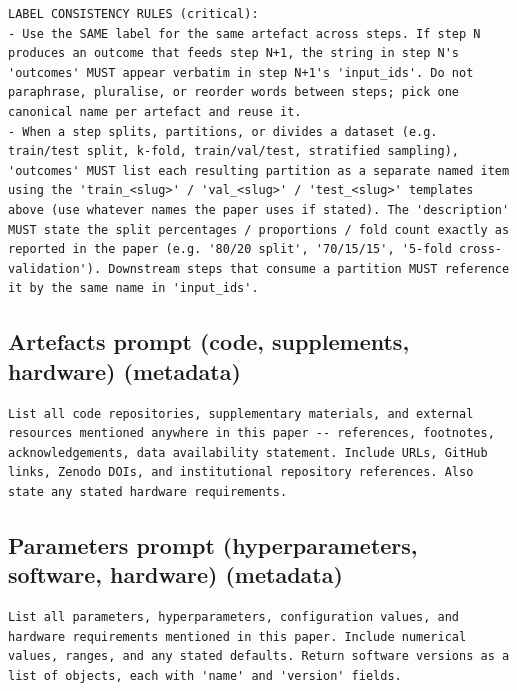 \documentclass{article}
\begin{document}
\begin{lstlisting}
LABEL CONSISTENCY RULES (critical):
- Use the SAME label for the same artefact across steps. If step N produces an outcome that feeds step N+1, the string in step N's 'outcomes' MUST appear verbatim in step N+1's 'input_ids'. Do not paraphrase, pluralise, or reorder words between steps; pick one canonical name per artefact and reuse it.
- When a step splits, partitions, or divides a dataset (e.g. train/test split, k-fold, train/val/test, stratified sampling), 'outcomes' MUST list each resulting partition as a separate named item using the 'train_<slug>' / 'val_<slug>' / 'test_<slug>' templates above (use whatever names the paper uses if stated). The 'description' MUST state the split percentages / proportions / fold count exactly as reported in the paper (e.g. '80/20 split', '70/15/15', '5-fold cross-validation'). Downstream steps that consume a partition MUST reference it by the same name in 'input_ids'.
\end{lstlisting}

\subsection{Artefacts prompt (code, supplements, hardware) (metadata)}
\label{app:prompts:artefacts}

\begin{lstlisting}
List all code repositories, supplementary materials, and external resources mentioned anywhere in this paper -- references, footnotes, acknowledgements, data availability statement. Include URLs, GitHub links, Zenodo DOIs, and institutional repository references. Also state any stated hardware requirements.
\end{lstlisting}

\subsection{Parameters prompt (hyperparameters, software, hardware) (metadata)}
\label{app:prompts:parameters}

\begin{lstlisting}
List all parameters, hyperparameters, configuration values, and hardware requirements mentioned in this paper. Include numerical values, ranges, and any stated defaults. Return software versions as a list of objects, each with 'name' and 'version' fields.
\end{lstlisting}




\clearpage
\end{document}
